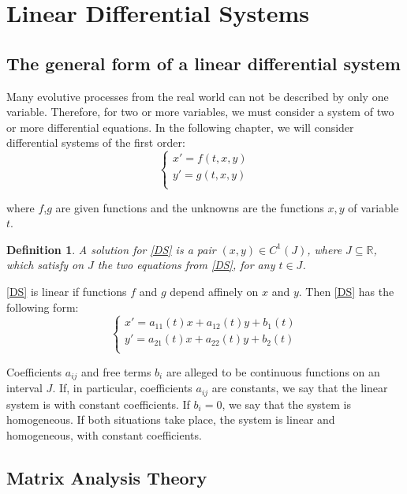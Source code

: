 \documentclass[a4paper,11pt]{report}
\newtheorem{definition}{Definition}[subsection]
\newcommand{\R}{\mathbb{R}}
\begin{document}
\section{Linear Differential Systems}
\subsection{The general form of a linear differential system}
Many evolutive processes from the real world can not be described by only one variable. Therefore, for two or more variables, we must consider a system 
of two or more differential equations. In the following chapter, we will consider differential systems of the first order:
\begin{equation}
\begin{cases}
 x'=f(t,x,y)\\ 
 y'=g(t,x,y)\\
\end{cases}
 \label{DS}\tag{DS}
\end{equation}

where $f$,$g$ are given functions and the unknowns are the functions $x,y$ of variable $t$. \\

\begin{definition} 
A solution for \eqref{DS} is a pair $(x,y)\in C^{1}(J)$, where $J\subseteq \R$, which satisfy on $J$ the two equations from \eqref{DS}, for 
any $t\in J$. 
\end{definition}
 
\eqref{DS} is linear if functions $f$ and $g$ depend affinely on $x$ and $y$. Then \eqref{DS} has the following form:
\begin{equation}
 \begin{cases}
  x'=a_{11}(t)x+a_{12}(t)y+b_{1}(t)\\
  y'=a_{21}(t)x+a_{22}(t)y+b_{2}(t)\\
 \end{cases}
\label{DS*}\tag{DS*}
\end{equation}

Coefficients $a_{ij}$ and free terms $b_{i}$ are alleged to be continuous functions on an interval $J$. If, in particular, coefficients $a_{ij}$
are constants, we say that the linear system is with constant coefficients. If $b_{i}=0$, we say that the system is homogeneous. If both situations
take place, the system is linear and homogeneous, with constant coefficients.

\subsection{Matrix Analysis Theory}
\end{document}
